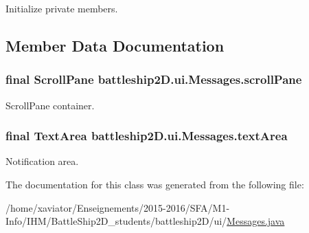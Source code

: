Initialize private members. 



\subsection{Member Data Documentation}
\hypertarget{classbattleship2D_1_1ui_1_1Messages_a84201bb441ec646a6aa7042cff5d85fc}{
\subsubsection[{scroll\-Pane}]{\setlength{\rightskip}{0pt plus 5cm}final Scroll\-Pane battleship2\-D.\-ui.\-Messages.\-scroll\-Pane\hspace{0.3cm}{\ttfamily [private]}}}\label{classbattleship2D_1_1ui_1_1Messages_a84201bb441ec646a6aa7042cff5d85fc}


Scroll\-Pane container. 

\hypertarget{classbattleship2D_1_1ui_1_1Messages_a76b095d2ee5a864b29a0081e22ffd752}{
\subsubsection[{text\-Area}]{\setlength{\rightskip}{0pt plus 5cm}final Text\-Area battleship2\-D.\-ui.\-Messages.\-text\-Area\hspace{0.3cm}{\ttfamily [private]}}}\label{classbattleship2D_1_1ui_1_1Messages_a76b095d2ee5a864b29a0081e22ffd752}


Notification area. 



The documentation for this class was generated from the following file\-:\begin{DoxyCompactItemize}
\item 
/home/xaviator/\-Enseignements/2015-\/2016/\-S\-F\-A/\-M1-\/\-Info/\-I\-H\-M/\-Battle\-Ship2\-D\-\_\-students/battleship2\-D/ui/\hyperlink{Messages_8java}{Messages.\-java}\end{DoxyCompactItemize}
